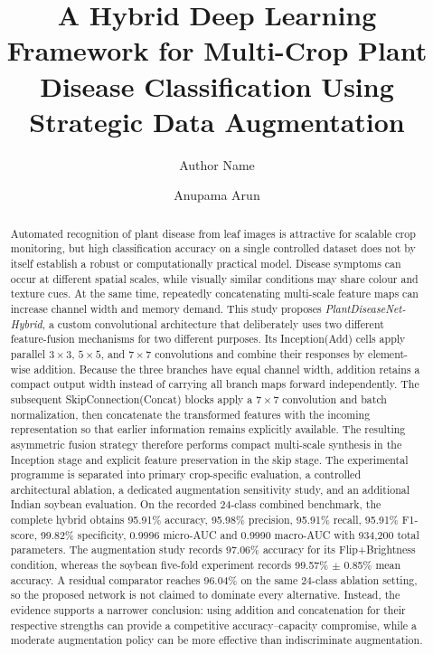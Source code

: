 \documentclass[a4paper,fleqn]{cas-dc}
\begin{document}
\let\WriteBookmarks\relax

\title[mode=title]{A Hybrid Deep Learning Framework for Multi-Crop Plant Disease Classification Using Strategic Data Augmentation}

\author[1]{Author Name}
\author[1]{Anupama Arun}

\begin{abstract}
Automated recognition of plant disease from leaf images is attractive for scalable crop monitoring, but high classification accuracy on a single controlled dataset does not by itself establish a robust or computationally practical model. Disease symptoms can occur at different spatial scales, while visually similar conditions may share colour and texture cues. At the same time, repeatedly concatenating multi-scale feature maps can increase channel width and memory demand. This study proposes \emph{PlantDiseaseNet-Hybrid}, a custom convolutional architecture that deliberately uses two different feature-fusion mechanisms for two different purposes. Its Inception(Add) cells apply parallel $3\times3$, $5\times5$, and $7\times7$ convolutions and combine their responses by element-wise addition. Because the three branches have equal channel width, addition retains a compact output width instead of carrying all branch maps forward independently. The subsequent SkipConnection(Concat) blocks apply a $7\times7$ convolution and batch normalization, then concatenate the transformed features with the incoming representation so that earlier information remains explicitly available. The resulting asymmetric fusion strategy therefore performs compact multi-scale synthesis in the Inception stage and explicit feature preservation in the skip stage. The experimental programme is separated into primary crop-specific evaluation, a controlled architectural ablation, a dedicated augmentation sensitivity study, and an additional Indian soybean evaluation. On the recorded 24-class combined benchmark, the complete hybrid obtains 95.91\% accuracy, 95.98\% precision, 95.91\% recall, 95.91\% F1-score, 99.82\% specificity, 0.9996 micro-AUC and 0.9990 macro-AUC with 934,200 total parameters. The augmentation study records 97.06\% accuracy for its Flip+Brightness condition, whereas the soybean five-fold experiment records 99.57\% $\pm$ 0.85\% mean accuracy. A residual comparator reaches 96.04\% on the same 24-class ablation setting, so the proposed network is not claimed to dominate every alternative. Instead, the evidence supports a narrower conclusion: using addition and concatenation for their respective strengths can provide a competitive accuracy--capacity compromise, while a moderate augmentation policy can be more effective than indiscriminate augmentation.
\end{abstract}
\end{document}
